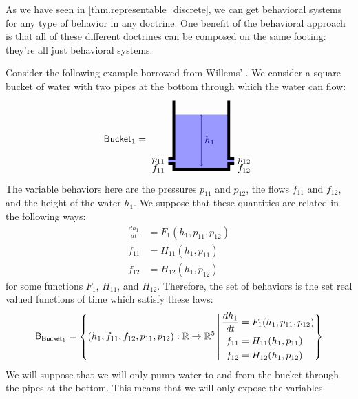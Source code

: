 \documentclass[DynamicalBook]{subfiles}
\begin{document}
As we have seen in
\cref{thm.representable_discrete}, we can get behavioral systems for any type of
behavior in any doctrine. One benefit of the behavioral approach is that all of
these different doctrines can be composed on the same footing: they're all just
behavioral systems.

Consider the following example borrowed from Willems'
\cite{Willems:Behavioral.Approach}. We consider a square bucket of water with
two pipes at the bottom through which the water can flow:
\[
  \Sys{Bucket}_1 =
  \begin{tikzpicture}[baseline=(center)]
    \fill[blue!40!white] (0, 0) rectangle (2,2);
    \fill[blue!40!white] (-.2, .2) rectangle (0.01,.4);
    \fill[blue!40!white] (2.2, .2) rectangle (1.99,.4);
    \draw[line width = .1cm] (0, 2.5) -- (0,.4) -- (-.2,.4);
    \draw[line width = .1cm] (-.2, .2) -- (0,.2) -- (0,0)
      -- (2,0) -- (2, .2) -- (2.2, .2);
    \draw[line width = .1cm] (2.2, .4) -- (2, .4) -- (2, 2.5);

    \draw[<->, blue!50!black] (1,.1cm) -- node[right] {$h_1$} (1, 2);
    \node[left] at (-.2, .3) {$p_{11}$};
    \node[below left] at (-.2, .3) {$f_{11}$};
    \node[right] at (2.2, .3) {$p_{12}$};
    \node[below right] at (2.2, .3) {$f_{12}$};

    \node (center) at (1, 1) {};
  \end{tikzpicture}
\]
The variable behaviors here are the pressures $p_{11}$ and $p_{12}$, the flows
$f_{11}$ and $f_{12}$, and the height of the water $h_1$. We suppose that these
quantities are related in the following ways:
\begin{align*}
  \frac{dh_1}{dt} &= F_1(h_1, p_{11}, p_{12}) \\
  f_{11} &= H_{11}(h_1, p_{11})\\
  f_{12} &= H_{12}(h_1, p_{12})
\end{align*}
for some functions $F_{1}$, $H_{11}$, and $H_{12}$. Therefore, the set of
behaviors is the set real valued functions of time which satisfy these laws:
\[
\mathsf{B}_{\mathsf{Bucket}_1} = \left\{ (h_1, f_{11}, f_{12}, p_{11}, p_{12}) : \mathbb{R}
  \to \mathbb{R}^5\, \middle|\,
\begin{aligned}
  \frac{dh_1}{dt} &= F_1(h_1, p_{11}, p_{12}) \\
  f_{11} &= H_{11}(h_1, p_{11})\\
  f_{12} &= H_{12}(h_1, p_{12})
\end{aligned}
\right\}
\]
We will suppose that we will only pump water to and from the bucket through the
pipes at the bottom. This means that we will only expose the variables
\end{document}
